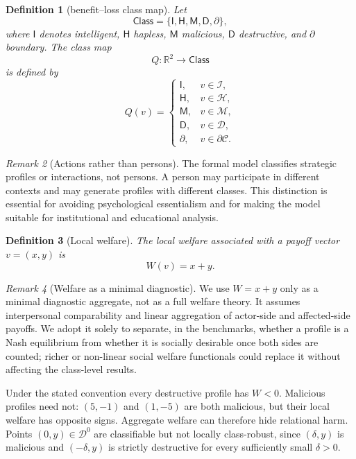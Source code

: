 \documentclass[a4paper,fleqn]{cas-dc}
\newtheorem{definition}{Definition}[section]
\theoremstyle{remark}
\newtheorem{remark}[definition]{Remark}
\newcommand{\R}{\mathbb{R}}
\newcommand{\Class}{\mathsf{Class}}
\newcommand{\Iclass}{\mathsf{I}}
\newcommand{\Hclass}{\mathsf{H}}
\newcommand{\Mclass}{\mathsf{M}}
\newcommand{\Dclass}{\mathsf{D}}
\newcommand{\Bclass}{\partial}
\begin{document}
\begin{definition}[benefit--loss class map]
Let
\[
\Class=\{\Iclass,\Hclass,\Mclass,\Dclass,\Bclass\},
\]
where $\Iclass$ denotes intelligent, $\Hclass$ hapless, $\Mclass$ malicious, $\Dclass$ destructive, and $\Bclass$ boundary. The class map
\[
Q:\R^2\longrightarrow \Class
\]
is defined by
\[
Q(v)=
\begin{cases}
\Iclass, & v\in\mathcal I,\\
\Hclass, & v\in\mathcal H,\\
\Mclass, & v\in\mathcal M,\\
\Dclass, & v\in\mathcal D,\\
\Bclass, & v\in\partial\mathcal C.
\end{cases}
\]
\end{definition}

\begin{remark}[Actions rather than persons]
The formal model classifies strategic profiles or interactions, not persons. A person may participate in different contexts and may generate profiles with different classes. This distinction is essential for avoiding psychological essentialism and for making the model suitable for institutional and educational analysis.
\end{remark}

\begin{definition}[Local welfare]
The local welfare associated with a payoff vector $v=(x,y)$ is
\[
W(v)=x+y.
\]
\end{definition}

\begin{remark}[Welfare as a minimal diagnostic]
We use $W=x+y$ only as a minimal diagnostic aggregate, not as a full welfare theory. It assumes interpersonal comparability and linear aggregation of actor-side and affected-side payoffs. We adopt it solely to separate, in the benchmarks, whether a profile is a Nash equilibrium from whether it is socially desirable once both sides are counted; richer or non-linear social welfare functionals could replace it without affecting the class-level results.
\end{remark}

Under the stated convention every destructive profile has $W<0$.
Malicious profiles need not: $(5,-1)$ and $(1,-5)$ are both malicious,
but their local welfare has opposite signs.  Aggregate welfare can therefore
hide relational harm.  Points $(0,y)\in\mathcal D^0$ are classifiable but not
locally class-robust, since $(\delta,y)$ is malicious and $(-\delta,y)$ is
strictly destructive for every sufficiently small $\delta>0$.
\end{document}
